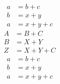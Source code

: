 \begin{equation*}
\begin{split}
a &= b + c   \\
b &= x + y  \\
a &= x + y + c
\end{split}
\end{equation*}
\begin{equation}
\begin{split}
\label{foo}
A &= B + C   \\
B &= X + Y  \\
Z &= X + Y + C
\end{split}
\end{equation}
\begin{equation}
\begin{split}
a &= b + c   \\
b &= x + y  \\
a &= x + y + c
\end{split}
\end{equation}
